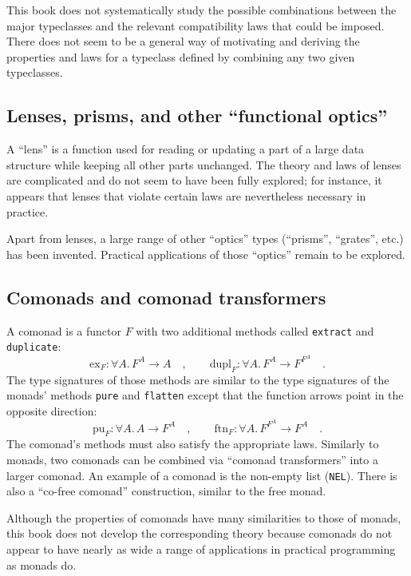 This book does not systematically study the possible combinations
between the major typeclasses and the relevant compatibility laws
that could be imposed. There does not seem to be a general way of
motivating and deriving the properties and laws for a typeclass defined
by combining any two given typeclasses.

\subsection{Lenses, prisms, and other \textquotedblleft functional optics\textquotedblright}

A \textsf{``}lens\textsf{''} is a function used for reading or updating a part of
a large data structure while keeping all other parts unchanged. The
theory and laws of lenses are complicated and do not seem to have
been fully explored; for instance, it appears that lenses that violate
certain laws are nevertheless necessary in practice. 

Apart from lenses, a large range of other \textsf{``}optics\textsf{''} types (\textsf{``}prisms\textsf{''},
\textsf{``}grates\textsf{''}, etc.) has been invented. Practical applications of those
\textsf{``}optics\textsf{''} remain to be explored.

\subsection{Comonads and comonad transformers}

A comonad is a functor $F$ with two additional methods called \lstinline!extract!
and \lstinline!duplicate!:
\[
\text{ex}_{F}:\forall A.\,F^{A}\rightarrow A\quad,\quad\quad\text{dupl}_{F}:\forall A.\,F^{A}\rightarrow F^{F^{A}}\quad.
\]
The type signatures of those methods are similar to the type signatures
of the monads\textsf{'} methods \lstinline!pure! and \lstinline!flatten!
except that the function arrows point in the opposite direction:
\[
\text{pu}_{F}:\forall A.\,A\rightarrow F^{A}\quad,\quad\quad\text{ftn}_{F}:\forall A.\,F^{F^{A}}\rightarrow F^{A}\quad.
\]
The comonad\textsf{'}s methods must also satisfy the appropriate laws. Similarly
to monads, two comonads can be combined via \textsf{``}comonad transformers\textsf{''}
into a larger comonad. An example of a comonad is the non-empty list
(\lstinline!NEL!). There is also a \textsf{``}co-free comonad\textsf{''} construction,
similar to the free monad.

Although the properties of comonads have many similarities to those
of monads, this book does not develop the corresponding theory because
comonads do not appear to have nearly as wide a range of applications
in practical programming as monads do.

